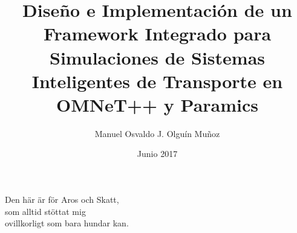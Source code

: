 \documentclass[upright, contnum]{umemoria}
\author{Manuel Osvaldo J. Olguín Muñoz}
\title{Diseño e Implementación de un Framework Integrado para Simulaciones de Sistemas Inteligentes de Transporte en OMNeT++ y Paramics}
\date{Junio 2017}
\begin{document}
\frontmatter
\maketitle

\begin{abstract}

\end{abstract}

\begin{dedicatoria}
Den här är för Aros och Skatt,\\ som alltid stöttat mig\\ ovillkorligt som bara hundar kan.
\end{dedicatoria}



\cleardoublepage
\dominitoc
\tableofcontents
\cleardoublepage
\listoftables
\cleardoublepage
\listoffigures

\mainmatter





%



\blankpage
\cleardoublepage

\printbibliography[heading=bibintoc]
    

\appendix

\end{document}
